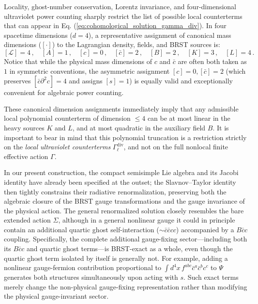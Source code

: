 Locality, ghost-number conservation, Lorentz invariance, and four-dimensional ultraviolet power counting sharply restrict the list of possible local counterterms that can appear in Eq. (\ref{eq:cohomological_solution_gamma_div}). In four spacetime dimensions (\(d=4\)), a representative assignment of canonical mass dimensions (\([\cdot]\)) to the Lagrangian density, fields, and BRST sources is:
\begin{equation} \label{eq:canonical_dimensions_assignment}
    [\mathcal{L}] = 4 \, , \quad [A] = 1 \, , \quad [c] = 0 \, , \quad [\bar{c}] = 2 \, , \quad [B] = 2 \, , \quad [K] = 3 \, , \quad [L] = 4 \, .
\end{equation}
Notice that while the physical mass dimensions of \(c\) and \(\bar{c}\) are often both taken as \(1\) in symmetric conventions, the asymmetric assignment \([c]=0, [\bar{c}]=2\) (which preserves \([\bar{c}\partial^2 c] = 4\) and assigns \([s] = 1\)) is equally valid and exceptionally convenient for algebraic power counting.

These canonical dimension assignments immediately imply that any admissible local polynomial counterterm of dimension \(\le 4\) can be at most linear in the heavy sources \(K\) and \(L\), and at most quadratic in the auxiliary field \(B\). It is important to bear in mind that this polynomial truncation is a restriction strictly on the \textit{local ultraviolet counterterms} \(\Gamma_\ell^{\text{div}}\), and not on the full nonlocal finite effective action \(\Gamma\).

In our present construction, the compact semisimple Lie algebra and its Jacobi identity have already been specified at the outset; the Slavnov--Taylor identity then tightly constrains their radiative renormalization, preserving both the algebraic closure of the BRST gauge transformations and the gauge invariance of the physical action. The general renormalized solution closely resembles the bare extended action \(\Sigma\), although in a general nonlinear gauge it could in principle contain an additional quartic ghost self-interaction (\(\sim \bar{c}\bar{c}cc\)) accompanied by a \(B\bar{c}c\) coupling. Specifically, the complete additional gauge-fixing sector—including both its \(B\bar{c}c\) and quartic ghost terms—is BRST-exact as a whole, even though the quartic ghost term isolated by itself is generally not. For example, adding a nonlinear gauge-fermion contribution proportional to \(\int d^4x \, f^{abc} \bar{c}^a \bar{c}^b c^c\) to \(\Psi\) generates both structures simultaneously upon acting with \(s\). Such exact terms merely change the non-physical gauge-fixing representation rather than modifying the physical gauge-invariant sector.

